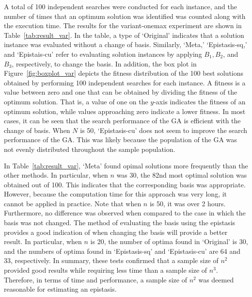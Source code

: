 A total of 100 independent searches were conducted for each instance, and the number of times that an optimum solution was identified was counted along with the execution time. The results for the variant-onemax experiment are shown in Table~\ref{tab:result_var}. In the table, a type of `Original' indicates that a solution instance was evaluated without a change of basis. Similarly, `Meta,' `Epistasis-sq,' and `Epistais-cu' refer to evaluating solution instances by applying $ B_1,B_2 $, and $ B_3 $, respectively, to change the basis. In addition, the box plot in Figure~\ref{fig:boxplot_var} depicts the fitness distribution of the 100 best solutions obtained by performing 100 independent searches for each instance. A fitness is a value between zero and one that can be obtained by dividing the fitness of the optimum solution. That is, a value of one on the $ y $-axis indicates the fitness of an optimum solution, while values approaching zero indicate a lower fitness. In most cases, it can be seen that the search performance of the GA is efficient with the change of basis. When $ N $ is 50, `Epistasis-cu' does not seem to improve the search performance of the GA. This was likely because the population of the GA was not evenly distributed throughout the sample population.


In Table~\ref{tab:result_var}, `Meta' found opimal solutions more frequently than the other methods. In particular, when $ n $ was 30, the 82nd most optimal solution was obtained out of 100. This indicates that the corresponding basis was appropriate. However, because the computation time for this approach was very long, it cannot be applied in practice. Note that when $ n $ is 50, it was over 2 hours. Furthermore, no difference was observed when compared to the case in which the basis was not changed. The method of evaluating the basis using the epistasis provides a good indication of when changing the basis will provide a better result. In particular, when $ n $ is 20, the number of optima found in `Original' is 30, and the numbers of optima found in `Epistasis-sq' and `Epistasis-cu' are 64 and 33, respectively. In summary, these tests confirmed that a sample size of $ n^2 $ provided good results while requiring less time than a sample size of $ n^3 $. Therefore, in terms of time and performance, a sample size of $ n^2 $ was deemed reasonable for estimating an epistasis.


